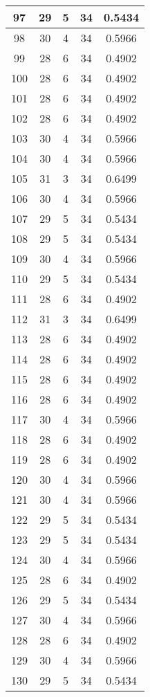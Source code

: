 \documentclass[letterpaper, 12pt]{article}
\begin{document}
\begin{longtable}{|c|c|c|c|c|}
\hline
97 & 29 & 5 & 34 & 0.5434 \\
\hline
98 & 30 & 4 & 34 & 0.5966 \\
\hline
99 & 28 & 6 & 34 & 0.4902 \\
\hline
100 & 28 & 6 & 34 & 0.4902 \\
\hline
101 & 28 & 6 & 34 & 0.4902 \\
\hline
102 & 28 & 6 & 34 & 0.4902 \\
\hline
103 & 30 & 4 & 34 & 0.5966 \\
\hline
104 & 30 & 4 & 34 & 0.5966 \\
\hline
105 & 31 & 3 & 34 & 0.6499 \\
\hline
106 & 30 & 4 & 34 & 0.5966 \\
\hline
107 & 29 & 5 & 34 & 0.5434 \\
\hline
108 & 29 & 5 & 34 & 0.5434 \\
\hline
109 & 30 & 4 & 34 & 0.5966 \\
\hline
110 & 29 & 5 & 34 & 0.5434 \\
\hline
111 & 28 & 6 & 34 & 0.4902 \\
\hline
112 & 31 & 3 & 34 & 0.6499 \\
\hline
113 & 28 & 6 & 34 & 0.4902 \\
\hline
114 & 28 & 6 & 34 & 0.4902 \\
\hline
115 & 28 & 6 & 34 & 0.4902 \\
\hline
116 & 28 & 6 & 34 & 0.4902 \\
\hline
117 & 30 & 4 & 34 & 0.5966 \\
\hline
118 & 28 & 6 & 34 & 0.4902 \\
\hline
119 & 28 & 6 & 34 & 0.4902 \\
\hline
120 & 30 & 4 & 34 & 0.5966 \\
\hline
121 & 30 & 4 & 34 & 0.5966 \\
\hline
122 & 29 & 5 & 34 & 0.5434 \\
\hline
123 & 29 & 5 & 34 & 0.5434 \\
\hline
124 & 30 & 4 & 34 & 0.5966 \\
\hline
125 & 28 & 6 & 34 & 0.4902 \\
\hline
126 & 29 & 5 & 34 & 0.5434 \\
\hline
127 & 30 & 4 & 34 & 0.5966 \\
\hline
128 & 28 & 6 & 34 & 0.4902 \\
\hline
129 & 30 & 4 & 34 & 0.5966 \\
\hline
130 & 29 & 5 & 34 & 0.5434 \\

\end{longtable}
\end{document}
